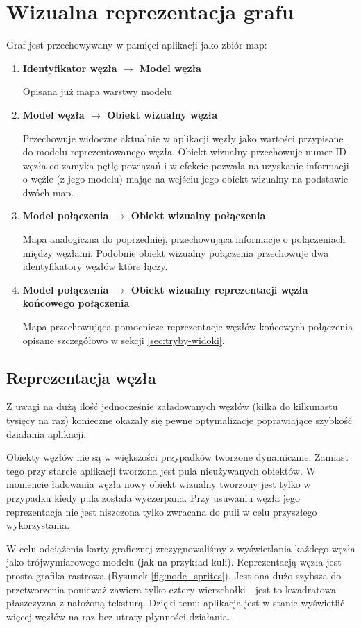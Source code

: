 \section{Wizualna reprezentacja grafu}
\label{sec:graf-reprezentacja}

\newcommand\mapitem[3]{
	\item \textbf{#1 $\to$ #2}

	#3
}

\noindent
Graf jest przechowywany w pamięci aplikacji jako zbiór map:
\begin{enumerate}[label=\textbullet]
	\mapitem{Identyfikator węzła}{Model węzła}{Opisana już mapa warstwy modelu}
	\mapitem{Model węzła}{Obiekt wizualny węzła}{Przechowuje widoczne aktualnie w aplikacji węzły jako wartości przypisane do modelu reprezentowanego węzła. Obiekt wizualny przechowuje numer ID węzła co zamyka pętlę powiązań i w efekcie pozwala na uzyskanie informacji o węźle (z jego modelu) mając na wejściu jego obiekt wizualny na podstawie dwóch map.}
	\mapitem{Model połączenia}{Obiekt wizualny połączenia}{Mapa analogiczna do poprzedniej, przechowująca informacje o połączeniach między węzłami. Podobnie obiekt wizualny połączenia przechowuje dwa identyfikatory węzłów które łączy.}
	
	\mapitem{Model połączenia}{Obiekt wizualny reprezentacji węzła końcowego połączenia}{Mapa przechowująca pomocnicze reprezentacje węzłów końcowych połączenia opisane szczegółowo w sekcji \ref{sec:tryby-widoki}.}
\end{enumerate}

\subsection{Reprezentacja węzła} Z uwagi na dużą ilość jednocześnie załadowanych węzłów (kilka do kilkunastu tysięcy na raz) konieczne okazały się pewne optymalizacje poprawiające szybkość działania aplikacji. 

Obiekty węzłów nie są w większości przypadków tworzone dynamicznie. Zamiast tego przy starcie aplikacji tworzona jest pula nieużywanych obiektów. W momencie ładowania węzła nowy obiekt wizualny tworzony jest tylko w przypadku kiedy pula została wyczerpana. Przy usuwaniu węzła jego reprezentacja nie jest niszczona tylko zwracana do puli w celu przyszłego wykorzystania.

W celu odciążenia karty graficznej zrezygnowaliśmy z wyświetlania każdego węzła jako trójwymiarowego modelu (jak na przykład kuli). Reprezentacją węzła jest prosta grafika rastrowa (Rysunek \ref{fig:node_sprites}). Jest ona dużo szybsza do przetworzenia ponieważ zawiera tylko cztery wierzchołki - jest to kwadratowa płaszczyzna z nałożoną teksturą. Dzięki temu aplikacja jest w stanie wyświetlić więcej węzłów na raz bez utraty płynności działania.

